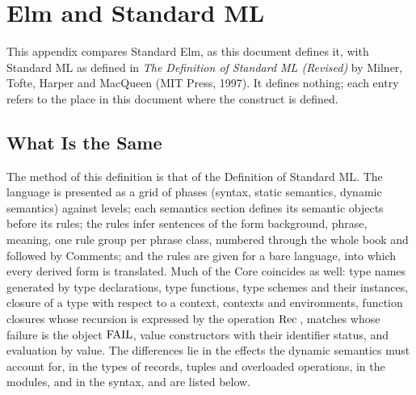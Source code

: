 
\chapter{Elm and Standard ML}\label{ch:appendix-standard-ml}

This appendix compares Standard Elm, as this document defines it, with
Standard ML as defined in \emph{The Definition of Standard ML (Revised)} by
Milner, Tofte, Harper and MacQueen (MIT Press, 1997). It defines nothing; each
entry refers to the place in this document where the construct is defined.

\section{What Is the Same}

The method of this definition is that of the Definition of Standard ML. %
The language is presented as a grid of phases (syntax, static semantics,
dynamic semantics) against levels; each semantics section defines its
semantic objects before its rules; the rules infer sentences of the form
background, phrase, meaning, one rule group per phrase class, numbered through
the whole book and followed by Comments; and the rules are given for a bare
language, into which every derived form is translated. Much of the Core
coincides as well: type names generated by type declarations, type functions,
type schemes and their instances, closure of a type with respect to a
context, contexts and environments, function closures whose recursion is
expressed by the operation $\mathrm{Rec}\,$, matches whose failure is the object
$\mathrm{FAIL}$, value constructors with their identifier status, and evaluation by
value. The differences lie in the effects the dynamic semantics must account
for, in the types of records, tuples and overloaded operations, in the
modules, and in the syntax, and are listed below. %

